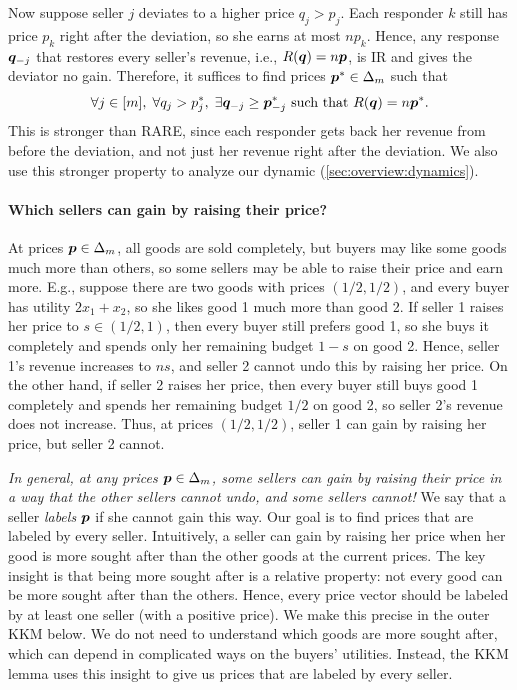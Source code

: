 Now suppose seller $j$ deviates to a higher price $q_j > p_j$.
Each responder $k$ still has price $p_k$ right after the deviation, so she earns at most $np_k$.
Hence, any response $\bm{q}_{-j}$ that restores every seller's revenue, i.e., $R(\bm{q}) = n\bm{p}$,
is IR and gives the deviator no gain.
Therefore, it suffices to find prices $\bm{p}^* \in \Delta_m$ such that
\begin{equation}
\label{eq:overview-restoration}
\forall j \in [m], \; \forall q_j > p^*_j, \;
\exists \bm{q}_{-j} \ge \bm{p}^*_{-j} \text{ such that } R(\bm{q}) = n\bm{p}^*.
\end{equation}
This is stronger than RARE, since each responder gets back her revenue from before the deviation,
and not just her revenue right after the deviation.
We also use this stronger property to analyze our dynamic (\cref{sec:overview:dynamics}).

\paragraph{Which sellers can gain by raising their price?}
At prices $\bm{p} \in \Delta_m$, all goods are sold completely,
but buyers may like some goods much more than others,
so some sellers may be able to raise their price and earn more.
E.g., suppose there are two goods with prices $(1/2, 1/2)$,
and every buyer has utility $2x_1 + x_2$, so she likes good 1 much more than good 2.
If seller 1 raises her price to $s \in (1/2, 1)$,
then every buyer still prefers good 1, so she buys it completely
and spends only her remaining budget $1 - s$ on good 2.
Hence, seller 1's revenue increases to $ns$,
and seller 2 cannot undo this by raising her price.
On the other hand, if seller 2 raises her price,
then every buyer still buys good 1 completely and spends her remaining budget $1/2$ on good 2,
so seller 2's revenue does not increase.
Thus, at prices $(1/2, 1/2)$, seller 1 can gain by raising her price, but seller 2 cannot.

\emph{In general, at any prices $\bm{p} \in \Delta_m$, some sellers can gain by raising their price
in a way that the other sellers cannot undo, and some sellers cannot!}
We say that a seller \emph{labels} $\bm{p}$ if she cannot gain this way.
Our goal is to find prices that are labeled by every seller.
Intuitively, a seller can gain by raising her price
when her good is more sought after than the other goods at the current prices.
The key insight is that being more sought after is a relative property:
not every good can be more sought after than the others.
Hence, every price vector should be labeled by at least one seller (with a positive price).
We make this precise in the outer KKM below.
We do not need to understand which goods are more sought after,
which can depend in complicated ways on the buyers' utilities.
Instead, the KKM lemma uses this insight to give us prices that are labeled by every seller.

